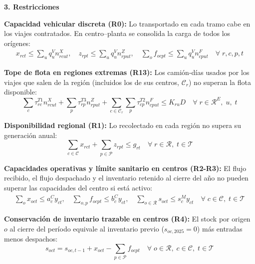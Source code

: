 \documentclass[letterpaper]{article}
\begin{document}
\textbf{3. Restricciones}

\textbf{Capacidad vehicular discreta (R0):} Lo transportado en cada tramo cabe en los viajes contratados. En centro--planta se consolida la carga de todos los orígenes:
\begin{align}
    x_{rct} \leq \sum_{u} q^{V}_{u} n^{X}_{rcut},\quad z_{rpt} \leq \sum_{u} q^{V}_{u} n^{Z}_{rput},\quad \sum_{o} f_{ocpt} \leq \sum_{u} q^{V}_{u} n^{F}_{cput} \quad \forall\; r,c,p,t \tag{R0}
\end{align}

\textbf{Tope de flota en regiones extremas (R13):} Los camión-días usados por los viajes que salen de la región (incluidos los de sus centros, $\mathcal{C}_r$) no superan la flota disponible:
\begin{equation}
    \sum_{c} \tau^{T1}_{rc} n^{X}_{rcut} + \sum_{p} \tau^{T3}_{rp} n^{Z}_{rput} + \sum_{c \in \mathcal{C}_r} \sum_{p} \tau^{T2}_{cp} n^{F}_{cput} \leq K_{ru} D \quad \forall\; r \in \mathcal{R}^{E},\; u,\; t \tag{R13}
\end{equation}

\textbf{Disponibilidad regional (R1):} Lo recolectado en cada región no supera su generación anual:
\begin{equation}
    \sum_{c \in \mathcal{C}} x_{rct} + \sum_{p \in \mathcal{P}} z_{rpt} \leq g_{rt} \quad \forall\; r \in \mathcal{R},\; t \in \mathcal{T} \tag{R1}
\end{equation}

\textbf{Capacidades operativas y límite sanitario en centros (R2-R3):} El flujo recibido, el flujo despachado y el inventario retenido al cierre del año no pueden superar las capacidades del centro si está activo:
\begin{align}
    \sum_{o} x_{oct} \leq a^{C}_{c} y_{ct}, \quad \sum_{o,p} f_{ocpt} \leq b^{C}_{c} y_{ct}, \quad \sum_{o \in \mathcal{R}} s_{oct} \leq s^{M}_{c} y_{ct} \quad \forall\; c \in \mathcal{C},\; t \in \mathcal{T} \tag{R2--R3}
\end{align}

\textbf{Conservación de inventario trazable en centros (R4):} El stock por origen $o$ al cierre del período equivale al inventario previo ($s_{oc,2025}=0$) más entradas menos despachos:
\begin{equation}
    s_{oct} = s_{oc,t-1} + x_{oct} - \sum_{p \in \mathcal{P}} f_{ocpt} \quad \forall\; o \in \mathcal{R},\; c \in \mathcal{C},\; t \in \mathcal{T} \tag{R4}
\end{equation}
\end{document}
